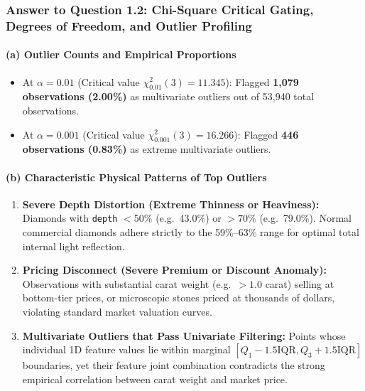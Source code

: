 \begin{tcolorbox}[colback=teal!3!white,colframe=teal!70!black,boxrule=0.7pt,arc=3pt,left=6pt,right=6pt,top=4pt,bottom=4pt,breakable,before upper={\sloppy\raggedright},title=\textbf{\small Notebook Analytical Narrative: Answer to Question 1.2}]
\subsubsection{\texorpdfstring{\textbf{Answer to Question 1.2: Chi-Square Critical Gating, Degrees of Freedom, and Outlier Profiling}}{Answer to Question 1.2: Chi-Square Critical Gating, Degrees of Freedom, and Outlier Profiling}}

\paragraph{\texorpdfstring{\textbf{(a) Outlier Counts and Empirical Proportions}}{(a) Outlier Counts and Empirical Proportions}}

\begin{itemize}
\tightlist
\item
  At \textbf{\(\alpha = 0.01\)} (Critical value \(\chi_{0.01}^2(3) = 11.345\)): Flagged \textbf{1,079 observations (2.00\%)} as multivariate outliers out of 53,940 total observations.
\item
  At \textbf{\(\alpha = 0.001\)} (Critical value \(\chi_{0.001}^2(3) = 16.266\)): Flagged \textbf{446 observations (0.83\%)} as extreme multivariate outliers.
\end{itemize}

\paragraph{\texorpdfstring{\textbf{(b) Characteristic Physical Patterns of Top Outliers}}{(b) Characteristic Physical Patterns of Top Outliers}}

\begin{enumerate}
\def\labelenumi{\arabic{enumi}.}
\tightlist
\item
  \textbf{Severe Depth Distortion (Extreme Thinness or Heaviness):} Diamonds with \texttt{depth} \(< 50\%\) (e.g.~43.0\%) or \(> 70\%\) (e.g.~79.0\%). Normal commercial diamonds adhere strictly to the 59\%--63\% range for optimal total internal light reflection.
\item
  \textbf{Pricing Disconnect (Severe Premium or Discount Anomaly):} Observations with substantial carat weight (e.g.~\(> 1.0\) carat) selling at bottom-tier prices, or microscopic stones priced at thousands of dollars, violating standard market valuation curves.
\item
  \textbf{Multivariate Outliers that Pass Univariate Filtering:} Points whose individual 1D feature values lie within marginal \([Q_1 - 1.5\mathrm{IQR}, Q_3 + 1.5\mathrm{IQR}]\) boundaries, yet their feature joint combination contradicts the strong empirical correlation between carat weight and market price.
\end{enumerate}


\end{tcolorbox}
